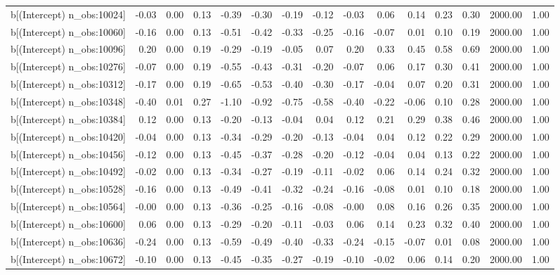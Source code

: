 \begin{table}[ht]
\begin{tabular}{rrrrrrrrrrrrrrr}
  b[(Intercept) n\_obs:10024] & -0.03 & 0.00 & 0.13 & -0.39 & -0.30 & -0.19 & -0.12 & -0.03 & 0.06 & 0.14 & 0.23 & 0.30 & 2000.00 & 1.00 \\ 
  b[(Intercept) n\_obs:10060] & -0.16 & 0.00 & 0.13 & -0.51 & -0.42 & -0.33 & -0.25 & -0.16 & -0.07 & 0.01 & 0.10 & 0.19 & 2000.00 & 1.00 \\ 
  b[(Intercept) n\_obs:10096] & 0.20 & 0.00 & 0.19 & -0.29 & -0.19 & -0.05 & 0.07 & 0.20 & 0.33 & 0.45 & 0.58 & 0.69 & 2000.00 & 1.00 \\ 
  b[(Intercept) n\_obs:10276] & -0.07 & 0.00 & 0.19 & -0.55 & -0.43 & -0.31 & -0.20 & -0.07 & 0.06 & 0.17 & 0.30 & 0.41 & 2000.00 & 1.00 \\ 
  b[(Intercept) n\_obs:10312] & -0.17 & 0.00 & 0.19 & -0.65 & -0.53 & -0.40 & -0.30 & -0.17 & -0.04 & 0.07 & 0.20 & 0.31 & 2000.00 & 1.00 \\ 
  b[(Intercept) n\_obs:10348] & -0.40 & 0.01 & 0.27 & -1.10 & -0.92 & -0.75 & -0.58 & -0.40 & -0.22 & -0.06 & 0.10 & 0.28 & 2000.00 & 1.00 \\ 
  b[(Intercept) n\_obs:10384] & 0.12 & 0.00 & 0.13 & -0.20 & -0.13 & -0.04 & 0.04 & 0.12 & 0.21 & 0.29 & 0.38 & 0.46 & 2000.00 & 1.00 \\ 
  b[(Intercept) n\_obs:10420] & -0.04 & 0.00 & 0.13 & -0.34 & -0.29 & -0.20 & -0.13 & -0.04 & 0.04 & 0.12 & 0.22 & 0.29 & 2000.00 & 1.00 \\ 
  b[(Intercept) n\_obs:10456] & -0.12 & 0.00 & 0.13 & -0.45 & -0.37 & -0.28 & -0.20 & -0.12 & -0.04 & 0.04 & 0.13 & 0.22 & 2000.00 & 1.00 \\ 
  b[(Intercept) n\_obs:10492] & -0.02 & 0.00 & 0.13 & -0.34 & -0.27 & -0.19 & -0.11 & -0.02 & 0.06 & 0.14 & 0.24 & 0.32 & 2000.00 & 1.00 \\ 
  b[(Intercept) n\_obs:10528] & -0.16 & 0.00 & 0.13 & -0.49 & -0.41 & -0.32 & -0.24 & -0.16 & -0.08 & 0.01 & 0.10 & 0.18 & 2000.00 & 1.00 \\ 
  b[(Intercept) n\_obs:10564] & -0.00 & 0.00 & 0.13 & -0.36 & -0.25 & -0.16 & -0.08 & -0.00 & 0.08 & 0.16 & 0.26 & 0.35 & 2000.00 & 1.00 \\ 
  b[(Intercept) n\_obs:10600] & 0.06 & 0.00 & 0.13 & -0.29 & -0.20 & -0.11 & -0.03 & 0.06 & 0.14 & 0.23 & 0.32 & 0.40 & 2000.00 & 1.00 \\ 
  b[(Intercept) n\_obs:10636] & -0.24 & 0.00 & 0.13 & -0.59 & -0.49 & -0.40 & -0.33 & -0.24 & -0.15 & -0.07 & 0.01 & 0.08 & 2000.00 & 1.00 \\ 
  b[(Intercept) n\_obs:10672] & -0.10 & 0.00 & 0.13 & -0.45 & -0.35 & -0.27 & -0.19 & -0.10 & -0.02 & 0.06 & 0.14 & 0.20 & 2000.00 & 1.00 \\ 

\end{tabular}
\end{table}
